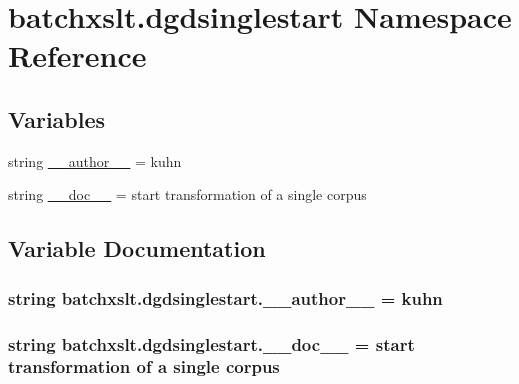 \hypertarget{namespacebatchxslt_1_1dgdsinglestart}{}\section{batchxslt.\+dgdsinglestart Namespace Reference}
\label{namespacebatchxslt_1_1dgdsinglestart}
\subsection*{Variables}
\begin{DoxyCompactItemize}
\item 
string \hyperlink{namespacebatchxslt_1_1dgdsinglestart_a33e8d49c00d1a8ef00791b531aebf753}{\+\_\+\+\_\+author\+\_\+\+\_\+} = \textquotesingle{}kuhn\textquotesingle{}
\item 
string \hyperlink{namespacebatchxslt_1_1dgdsinglestart_abc2dca43da0d8f1e629dbc619c2774d7}{\+\_\+\+\_\+doc\+\_\+\+\_\+} = \textquotesingle{}start transformation of a single corpus\textquotesingle{}
\end{DoxyCompactItemize}


\subsection{Variable Documentation}
\hypertarget{namespacebatchxslt_1_1dgdsinglestart_a33e8d49c00d1a8ef00791b531aebf753}{}
\subsubsection[{\+\_\+\+\_\+author\+\_\+\+\_\+}]{\setlength{\rightskip}{0pt plus 5cm}string batchxslt.\+dgdsinglestart.\+\_\+\+\_\+author\+\_\+\+\_\+ = \textquotesingle{}kuhn\textquotesingle{}}\label{namespacebatchxslt_1_1dgdsinglestart_a33e8d49c00d1a8ef00791b531aebf753}
\hypertarget{namespacebatchxslt_1_1dgdsinglestart_abc2dca43da0d8f1e629dbc619c2774d7}{}
\subsubsection[{\+\_\+\+\_\+doc\+\_\+\+\_\+}]{\setlength{\rightskip}{0pt plus 5cm}string batchxslt.\+dgdsinglestart.\+\_\+\+\_\+doc\+\_\+\+\_\+ = \textquotesingle{}start transformation of a single corpus\textquotesingle{}}\label{namespacebatchxslt_1_1dgdsinglestart_abc2dca43da0d8f1e629dbc619c2774d7}
